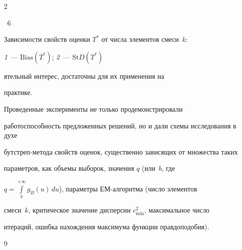 \begin{multicols}{2}
\begin{center}
{}


\end{center}


\vspace*{2pt}




{{\figurename~6}\ \ \small{Зависимости свойств оценки $T^*$ от числа элементов смеси~$k$: 


\textit{1}~--- $\mathrm{Bias} (T^*)$; \textit{2}~--- $\mathrm{St}D(T^*)$}}








\bigskip


\addtocounter{figure}{1}  





\noindent


ятельный интерес, достаточны для их применения на 


практике. 


Проведенные эксперименты не только продемонстрировали 


работоспособность предложенных решений, но и дали схемы исследования в духе 


бутстреп-метода свойств оценок, сущест\-вен\-но зависящих от множества таких 


параметров, как объемы выборок, значения $q$ (или~$b$, где 


$q=\int\limits_b^{+\infty} g_B(u)\,du$), параметры ЕМ-алгоритма (число элементов 


смеси~$k$, критическое значение дис\-пер\-сии $c^2_{\min}$, максимальное число 


итераций, ошибка нахождения максимума функции правдоподобия).


{%





}


     


{\small\frenchspacing


{%




\begin{thebibliography}{9}







\end{thebibliography}}}
\end{multicols}
